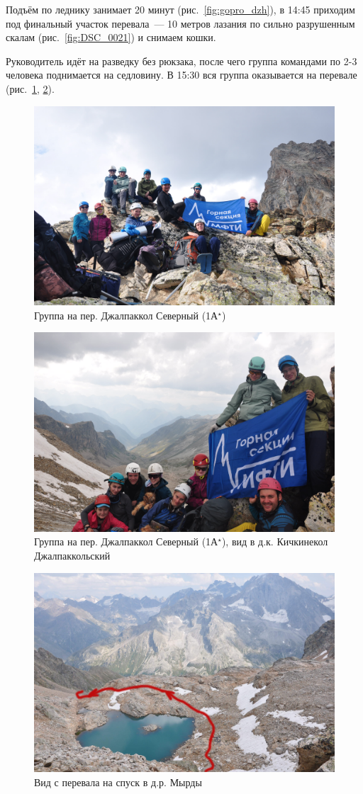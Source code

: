 Подъём по леднику занимает 20 минут (рис.~\ref{fig:gopro_dzh}), в 14:45 приходим под финальный участок перевала~--- 10 метров лазания по сильно разрушенным скалам (рис.~\ref{fig:DSC_0021}) и снимаем кошки.

Руководитель идёт на разведку без рюкзака, после чего группа командами по 2-3 человека поднимается на седловину. В 15:30 вся группа оказывается на перевале (рис.~\ref{fig:DSC_0063}, \ref{fig:DSC_0069}).

\begin{figure}[h!]	
	\centering
	\includegraphics[angle=0, width=0.7\linewidth]{../pics/DSC_0063}
	\caption{Группа на пер. Джалпаккол Северный (1А$^\star$)}
	\label{fig:DSC_0063}
\end{figure}

\begin{figure}[h!]	
	\centering
	\includegraphics[angle=0, width=0.7\linewidth]{../pics/DSC_0069}
	\caption{Группа на пер. Джалпаккол Северный (1А$^\star$), вид в д.к. Кичкинекол Джалпаккольский}
	\label{fig:DSC_0069}
\end{figure}

\begin{figure}[h!]	
	\centering
	\includegraphics[angle=0, width=0.7\linewidth]{../pics/DSC_0041}
	\caption{Вид с перевала на спуск в д.р. Мырды}
	\label{fig:DSC_0041}
\end{figure}

